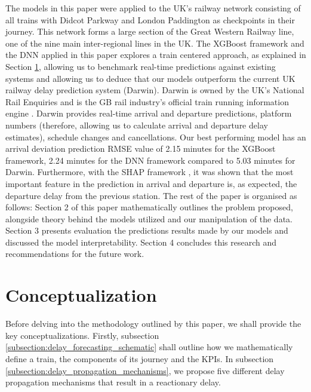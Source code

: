\documentclass[]{interact}
\theoremstyle{plain}%
\theoremstyle{definition}
\theoremstyle{remark}
\begin{document}
The models in this paper were applied to the UK's railway network consisting of all trains with Didcot Parkway and London Paddington as checkpoints in their journey. This network forms a large section of the Great Western Railway line, one of the nine main inter-regional lines in the UK. The XGBoost framework and the DNN applied in this paper explores a train centered approach, as explained in Section \ref{ProblemFormulationSection},  allowing us to benchmark real-time predictions against existing systems and allowing us to deduce that our models outperform the current UK railway delay prediction system (Darwin). Darwin is owned by the UK’s National Rail Enquiries and is the GB rail industry’s official train running information engine \citep{BLE19}. Darwin provides real-time arrival and departure predictions, platform numbers (therefore, allowing us to calculate arrival and departure delay estimates), schedule changes and cancellations. Our best performing model has an arrival deviation prediction RMSE value of 2.15 minutes for the XGBoost framework, 2.24 minutes for the DNN framework compared to 5.03 minutes for Darwin. Furthermore, with the SHAP framework \citep{LUN17}, it was shown that the most important feature in the prediction in arrival and departure is, as expected, the departure delay from the previous station. The rest of the paper is organised as follows: Section 2 of this paper mathematically outlines the problem proposed, alongside theory behind the models utilized and our manipulation of the data. Section 3 presents evaluation the predictions results made by our models and discussed the model interpretability. Section 4 concludes this research and recommendations for the future work.


\section{Conceptualization}\label{ProblemFormulationSection}
Before delving into the methodology outlined by this paper, we shall provide the key conceptualizations. Firstly, subsection \ref{subsection:delay_forecasting_schematic} shall outline how we mathematically define a train, the components of its journey and the KPIs. In subsection \ref{subsection:delay_propagation_mechanisms}, we propose five different delay propagation mechanisms that result in a reactionary delay.
\end{document}
